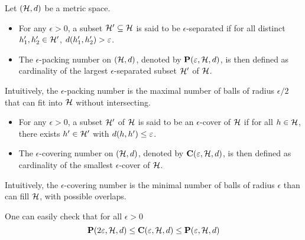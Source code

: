 \begin{tcolorbox}
    \begin{definition}
        Let $(\mathcal{H}, d)$ be a metric space. 
        \begin{itemize}
            \item For any $\epsilon> 0$, a subset $\mathcal{H}' \subseteq \mathcal{H}$ is said to be $\epsilon$-separated if for all distinct $h'_1, h'_2 \in \mathcal{H}'$, $d(h'_1, h'_2) > \varepsilon$.
            \item The $\epsilon$-packing number on $(\mathcal{H}, d)$, denoted by $\mathbf{P}(\varepsilon, \mathcal{H}, d)$, is then defined as cardinality of the largest $\epsilon$-separated subset $\mathcal{H}'$ of $\mathcal{H}$.
        \end{itemize}
        Intuitively, the $\epsilon$-packing number is the maximal number of balls of radius $\epsilon/2$ that can fit into $\mathcal{H}$ without intersecting.
        \begin{itemize}
            \item For any $\epsilon> 0$, a subset $\mathcal{H}'$ of $\mathcal{H}$ is said to be an $\epsilon$-cover of $\mathcal{H}$ if for all $h \in \mathcal{H}$, there exists $h' \in \mathcal{H}'$ with $d(h, h') \leq \varepsilon$.
            \item The $\epsilon$-covering number on $(\mathcal{H}, d)$, denoted by $\mathbf{C}(\varepsilon, \mathcal{H}, d)$, is then defined as cardinality of the smallest $\epsilon$-cover of $\mathcal{H}$.
        \end{itemize}
        Intuitively, the $\epsilon$-covering number is the minimal number of balls of radius $\epsilon$ than can fill $\mathcal{H}$, with possible overlaps.
    \end{definition}
\end{tcolorbox}

    One can easily check that for all $\epsilon>0$
    \begin{equation}
		\label{eqn__pack_cover_pack}
        \mathbf{P}(2\varepsilon, \mathcal{H}, d) \leq \mathbf{C}(\varepsilon, \mathcal{H}, d) \leq \mathbf{P}(\varepsilon, \mathcal{H}, d)
    \end{equation}





